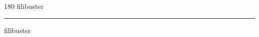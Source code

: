 
\begin{frame}
\begin{center}
\begin{turn}{180}
{\fontsize{2.5cm}{1em}\selectfont filibuster}
\end{turn}
\vspace{1em}\par  
\hrule
\vspace{1em}\par  
{\fontsize{2.5cm}{1em}\selectfont filibuster}
\end{center}
\end{frame}
